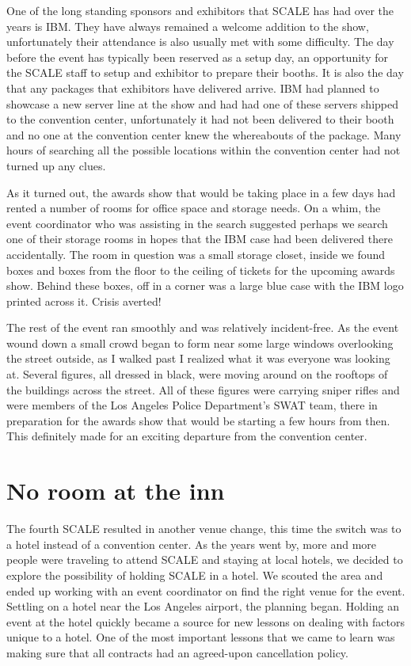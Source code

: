 One of the long standing sponsors and exhibitors that SCALE has had over the
years is IBM. They have always remained a welcome addition to the show,
unfortunately their attendance is also usually met with some difficulty. The
day before the event has typically been reserved as a setup day, an opportunity
for the SCALE staff to setup and exhibitor to prepare their booths. It is also
the day that any packages that exhibitors have delivered arrive. IBM had
planned to showcase a new server line at the show and had had one of these
servers shipped to the convention center, unfortunately it had not been
delivered to their booth and no one at the convention center knew the
whereabouts of the package. Many hours of searching all the possible locations
within the convention center had not turned up any clues.

As it turned out, the awards show that would be taking place in a few days had
rented a number of rooms for office space and storage needs. On a whim, the
event coordinator who was assisting in the search suggested perhaps we search
one of their storage rooms in hopes that the IBM case had been delivered there
accidentally. The room in question was a small storage closet, inside we found
boxes and boxes from the floor to the ceiling of tickets for the upcoming awards
show. Behind these boxes, off in a corner was a large blue case with the IBM
logo printed across it. Crisis averted!

The rest of the event ran smoothly and was relatively incident-free. As the
event wound down a small crowd began to form near some large windows overlooking
the street outside, as I walked past I realized what it was everyone was looking
at. Several figures, all dressed in black, were moving around on the rooftops of
the buildings across the street. All of these figures were carrying sniper
rifles and were members of the Los Angeles Police Department’s SWAT team, there
in preparation for the awards show that would be starting a few hours from then.
This definitely made for an exciting departure from the convention center.

\section*{No room at the inn}

The fourth SCALE resulted in another venue change, this time the switch was to a
hotel instead of a convention center. As the years went by, more and more people
were traveling to attend SCALE and staying at local hotels, we decided to
explore the possibility of holding SCALE in a hotel. We scouted the area and
ended up working with an event coordinator on find the right venue for the
event. Settling on a hotel near the Los Angeles airport, the planning began. 
Holding an event at the hotel quickly became a source for new lessons on dealing
with factors unique to a hotel. One of the most important lessons that we came
to learn was making sure that all contracts had an agreed-upon cancellation
policy.

